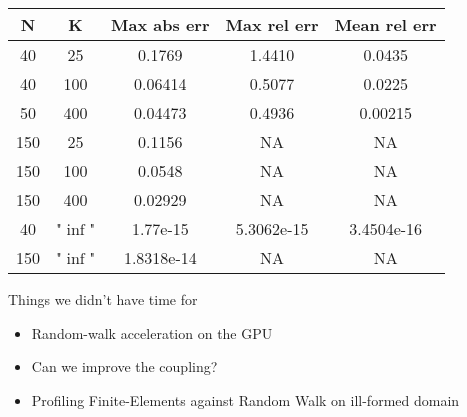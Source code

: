 \documentclass{beamer}
\begin{document}
\begin{frame}
\begin{center}
	\begin{tabular}{|c|c|c|c|c|}
		\hline
		N & K & Max abs err & Max rel err & Mean rel err \\  
		\hline 
		40 & 25 & 0.1769 & 1.4410 & 0.0435 \\
		40 & 100 & 0.06414 & 0.5077 & 0.0225 \\
		50 & 400 & 0.04473 & 0.4936 & 0.00215 \\
		150 & 25 & 0.1156 & NA & NA \\
		150 & 100 & 0.0548 & NA & NA \\
		150 & 400 & 0.02929 & NA & NA \\
		40 & "$\inf$" & 1.77e-15 & 5.3062e-15 & 3.4504e-16 \\ 
		150 & "$\inf$" & 1.8318e-14 & NA & NA \\
		\hline
	\end{tabular}
	\end{center}
\end{frame}



\begin{frame}{Things we didn't have time for}
	\begin{itemize}
		\item Random-walk acceleration on the GPU
		\item Can we improve the coupling?
		\item Profiling Finite-Elements against Random Walk on ill-formed domain
	\end{itemize}
\end{frame}

\end{document}
